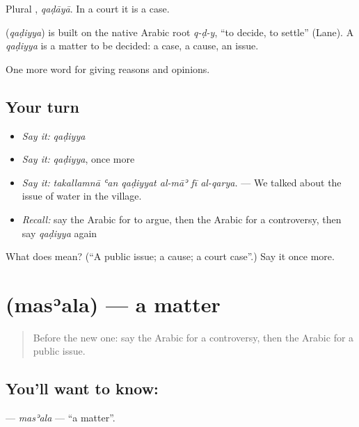 Plural , \emph{qaḍāyā}. In a court it is a case.

\begin{cousinweb}
\textbf{} (\emph{qaḍiyya}) is built on the native Arabic root \emph{q-ḍ-y}, \textquotedblleft{}to decide, to settle\textquotedblright{} (Lane). A \emph{qaḍiyya} is a matter to be decided: a case, a cause, an issue.
\end{cousinweb}

\begin{grammarlens}[title={What you've built}]
One more word for giving reasons and opinions.
\end{grammarlens}

\subsection*{Your turn}
\begin{itemize}
\raggedright
  \item \emph{Say it:} \emph{qaḍiyya}
  \item \emph{Say it:} \emph{qaḍiyya}, once more
  \item \emph{Say it:} \emph{takallamnā ʿan qaḍiyyat al-māʾ fī al-qarya.} — We talked about the issue of water in the village.
  \item \emph{Recall:} say the Arabic for to argue, then the Arabic for a controversy, then say \emph{qaḍiyya} again
\end{itemize}

\begin{tcolorbox}[breakable,colback=teal!4,colframe=teal!35!black,title={Before you move on}]
What does  mean? (\textquotedblleft{}A public issue; a cause; a court case\textquotedblright{}.) Say it once more.
\end{tcolorbox}
\section[\texorpdfstring{\ar{مسألة} (masʾala)}{مسألة (masʾala)}]{ (masʾala) — a matter}

\label{lesson:AR-C361-masala}



\begin{quote}
Before the new one: say the Arabic for a controversy, then the Arabic for a public issue.
\end{quote}

\subsection*{You'll want to know: }
\textbf{} — \emph{masʾala} — \textquotedblleft{}a matter\textquotedblright{}.

